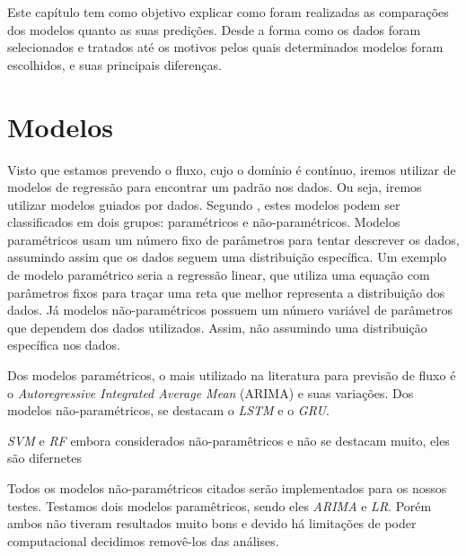 




Este capítulo tem como objetivo explicar como foram realizadas as comparações dos modelos quanto as suas predições. Desde a forma como os dados foram selecionados e tratados até os motivos pelos quais determinados modelos foram escolhidos, e suas principais diferenças. 

\section{Modelos}

Visto que estamos prevendo o fluxo, cujo o domínio é contínuo, iremos utilizar de modelos de regressão para encontrar um padrão nos dados. Ou seja, iremos utilizar modelos guiados por dados. Segundo \cite{parametric}, estes modelos podem ser classificados em dois grupos: paramétricos e não-paramétricos. Modelos paramétricos usam um número fixo de parâmetros para tentar descrever os dados, assumindo assim que os dados seguem uma distribuição específica. Um exemplo de modelo paramétrico seria a regressão linear, que utiliza uma equação com parâmetros fixos para traçar uma reta que melhor representa a distribuição dos dados. Já modelos não-paramétricos possuem um número variável de parâmetros que dependem dos dados utilizados. Assim, não assumindo uma distribuição específica nos dados.

Dos modelos paramétricos, o mais utilizado na literatura para previsão de fluxo é o \textit{Autoregressive Integrated Average Mean} (ARIMA) e suas variações. Dos modelos não-paramétricos, se destacam o \textit{\acrfull{LSTM}} e o \textit{\acrfull{GRU}}.

\textit{\acrfull{SVM}} e \textit{\acrfull{RF}} embora considerados não-paramêtricos e não se destacam muito, eles são difernetes

Todos os modelos não-paramétricos citados serão implementados para os nossos testes. Testamos dois modelos paramêtricos, sendo eles \textit{\acrfull{ARIMA}} e \textit{\acrfull{LR}}. Porém ambos não tiveram resultados muito bons e devido há limitações de poder computacional decidimos removê-los das análises.

